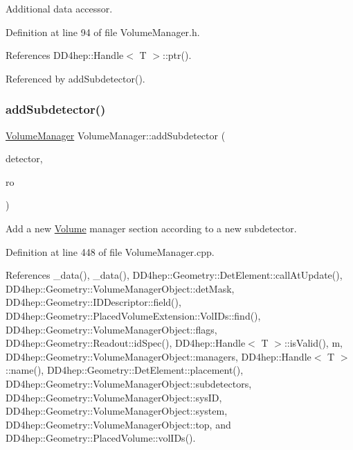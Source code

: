 Additional data accessor. 



Definition at line 94 of file Volume\+Manager.\+h.



References D\+D4hep\+::\+Handle$<$ T $>$\+::ptr().



Referenced by add\+Subdetector().

\hypertarget{class_d_d4hep_1_1_geometry_1_1_volume_manager_a6a9318986cf6574d07eaa86ea4da5085}{}\label{class_d_d4hep_1_1_geometry_1_1_volume_manager_a6a9318986cf6574d07eaa86ea4da5085} 
\subsubsection{\texorpdfstring{add\+Subdetector()}{addSubdetector()}}
{\footnotesize\ttfamily \hyperlink{class_d_d4hep_1_1_geometry_1_1_volume_manager}{Volume\+Manager} Volume\+Manager\+::add\+Subdetector (\begin{DoxyParamCaption}\item[{\hyperlink{class_d_d4hep_1_1_geometry_1_1_det_element}{Det\+Element}}]{detector,  }\item[{\hyperlink{class_d_d4hep_1_1_geometry_1_1_readout}{Readout}}]{ro }\end{DoxyParamCaption})}



Add a new \hyperlink{class_d_d4hep_1_1_geometry_1_1_volume}{Volume} manager section according to a new subdetector. 



Definition at line 448 of file Volume\+Manager.\+cpp.



References \+\_\+data(), \+\_\+data(), D\+D4hep\+::\+Geometry\+::\+Det\+Element\+::call\+At\+Update(), D\+D4hep\+::\+Geometry\+::\+Volume\+Manager\+Object\+::det\+Mask, D\+D4hep\+::\+Geometry\+::\+I\+D\+Descriptor\+::field(), D\+D4hep\+::\+Geometry\+::\+Placed\+Volume\+Extension\+::\+Vol\+I\+Ds\+::find(), D\+D4hep\+::\+Geometry\+::\+Volume\+Manager\+Object\+::flags, D\+D4hep\+::\+Geometry\+::\+Readout\+::id\+Spec(), D\+D4hep\+::\+Handle$<$ T $>$\+::is\+Valid(), m, D\+D4hep\+::\+Geometry\+::\+Volume\+Manager\+Object\+::managers, D\+D4hep\+::\+Handle$<$ T $>$\+::name(), D\+D4hep\+::\+Geometry\+::\+Det\+Element\+::placement(), D\+D4hep\+::\+Geometry\+::\+Volume\+Manager\+Object\+::subdetectors, D\+D4hep\+::\+Geometry\+::\+Volume\+Manager\+Object\+::sys\+ID, D\+D4hep\+::\+Geometry\+::\+Volume\+Manager\+Object\+::system, D\+D4hep\+::\+Geometry\+::\+Volume\+Manager\+Object\+::top, and D\+D4hep\+::\+Geometry\+::\+Placed\+Volume\+::vol\+I\+Ds().



